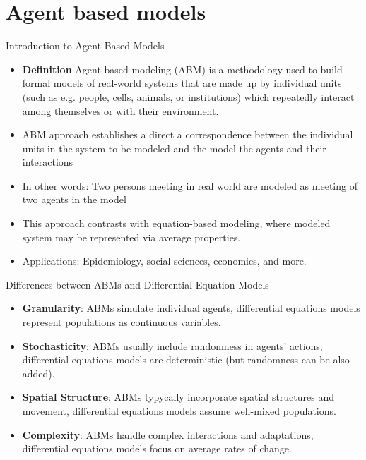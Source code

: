 \section{Agent based models}

\begin{frame}{Introduction to Agent-Based Models}
\begin{itemize}

\item \textbf{Definition} Agent-based modeling (ABM) is a methodology used to build formal models of real-world systems that are made up by individual units (such as e.g. people, cells, animals,  or institutions) which repeatedly interact among themselves or with their environment.
    \pause
\item ABM approach establishes a direct a correspondence between the individual units in the system to be modeled and the model the agents and their interactions
\item In other words: Two persons meeting in real world are modeled as meeting of two agents in the model
    \pause
\item This approach contrasts with  equation-based modeling, where modeled system may be represented via average properties.
    \pause
\item Applications: Epidemiology, social sciences, economics, and more.
\end{itemize}
\end{frame}

\begin{frame}{Differences between ABMs and Differential Equation Models}
\begin{itemize}
    \item \textbf{Granularity}: ABMs simulate individual agents, differential equations models represent populations as continuous variables.
    \pause
    \item \textbf{Stochasticity}: ABMs usually include randomness in agents' actions, differential equations models are deterministic (but randomness can be also added).
        \pause
    \item \textbf{Spatial Structure}: ABMs typycally incorporate spatial structures and movement, differential equations models  assume well-mixed populations.
        \pause
    \item \textbf{Complexity}: ABMs handle complex interactions and adaptations, differential equations models focus on average rates of change.
\end{itemize}
\end{frame}

